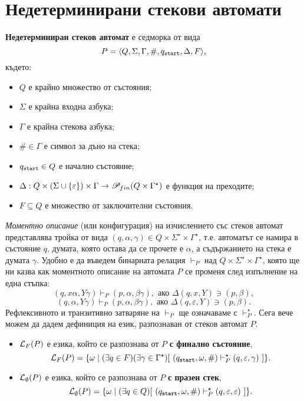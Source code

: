 \section{Недетерминирани стекови автомати}

{\bf Недетерминиран стеков автомат} е седморка от вида
\[P = \langle{Q,\Sigma,\Gamma,\#,q_{\texttt{start}},\Delta,F}\rangle,\] където:
\begin{itemize}
\item
  $Q$ е крайно множество от състояния;
\item  
  $\Sigma$ е крайна входна азбука;
\item
  $\Gamma$ е крайна стекова азбука;
\item
  $\# \in \Gamma$ е символ за дъно на стека;
\item
  $q_{\texttt{start}} \in Q$ е начално състояние;
\item
  $\Delta:Q\times(\Sigma \cup \{\varepsilon\})\times\Gamma\rightarrow \mathscr{P}_{fin}(Q\times\Gamma^\star)$ 
  е функция на преходите;    
\item
  $F\subseteq Q$ е множество от заключителни състояния.
\end{itemize}

{\em Моментно описание} (или конфигурация) на изчислението със стеков автомат представлява тройка от вида $(q,\alpha,\gamma) \in Q\times\Sigma^\star\times\Gamma^\star$,
т.е. автоматът се намира в състояние $q$, думата, която остава да се прочете е $\alpha$,
а съдържанието на стека е думата $\gamma$.
Удобно е да въведем бинарната релация $\vdash_P$ над $Q\times\Sigma^\star\times\Gamma^\star$,
която ще ни казва как моментното описание на автомата $P$ се променя след изпълнение на една стъпка:
\[(q,x\alpha,Y\gamma) \vdash_P (p,\alpha,\beta\gamma), \text{ ако } \Delta(q,x,Y) \ni (p,\beta),\]
\[(q,\alpha,Y\gamma) \vdash_P (p,\alpha,\beta\gamma), \text{ ако } \Delta(q,\varepsilon,Y) \ni (p,\beta).\]
Рефлексивното и транзитивно затваряне на $\vdash_P$ ще означаваме с $\vdash^\star_P$.
Сега вече можем да дадем дефиниция на език, разпознаван от стеков автомат $P$.
\begin{itemize}
\item
  $\mathcal{L}_F(P)$ е езика, който се разпознава от $P$ {\bf с финално състояние},
  \[\mathcal{L}_F(P) = \{\omega \mid (\exists q \in F)(\exists \gamma \in \Gamma^\star)[\ (q_{\texttt{start}},\omega,\#) \vdash^\star_P (q,\varepsilon,\gamma)\ ]\}.\]    
\item
  $\mathcal{L}_\emptyset(P)$ е езика, който се разпознава от $P$  {\bf с празен стек},
  \[\L_\emptyset(P) = \{\omega \mid (\exists q \in Q)[\ (\qstart,\omega,\#) \vdash^\star_P (q,\varepsilon,\varepsilon)\ ]\}.\]
\end{itemize}

